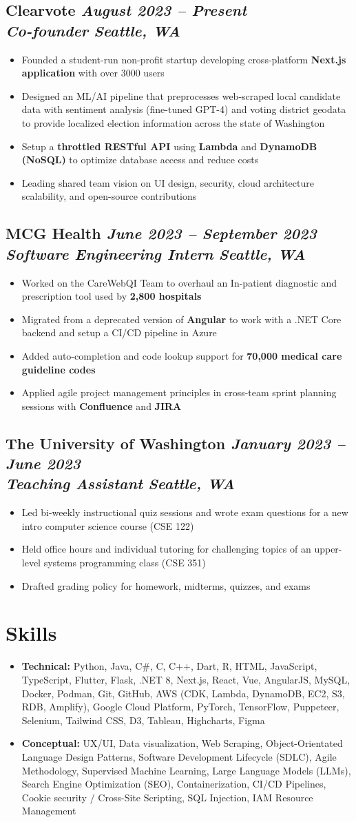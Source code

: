 \documentclass[11pt]{article}
\newcommand{\resumeItem}[1]{
  \item\small{#1}
}
\newcommand{\resumeSubheading}[4]{
  \vspace{-0.5em}
  \subsection{
    \textbf{#1} \hfill \textit{\small#2} \\
    \textit{\small#3} \hfill \textit{\small#4}
  }
  \vspace{-0.5em}
}
\begin{document}
\resumeSubheading{Clearvote}{August 2023 – Present}{Co-founder}{Seattle, WA}
\begin{itemize}[leftmargin=*]
  \resumeItem{Founded a student-run non-profit startup developing cross-platform \textbf{Next.js application} with over 3000 users}
  \resumeItem{Designed an ML/AI pipeline that preprocesses web-scraped local candidate data with sentiment analysis (fine-tuned GPT-4) and voting district geodata to provide localized election information across the state of Washington}
  \resumeItem{Setup a \textbf{throttled RESTful API} using \textbf{Lambda} and \textbf{DynamoDB (NoSQL)} to optimize database access and reduce costs}
  \resumeItem{Leading shared team vision on UI design, security, cloud architecture scalability, and open-source contributions}
\end{itemize}

\resumeSubheading{MCG Health}{June 2023 – September 2023}{Software Engineering Intern}{Seattle, WA}
\begin{itemize}[leftmargin=*]
  \resumeItem{Worked on the CareWebQI Team to overhaul an In-patient diagnostic and prescription tool used by \textbf{2,800 hospitals}}
  \resumeItem{Migrated from a deprecated version of \textbf{Angular} to work with a .NET Core backend and setup a CI/CD pipeline in Azure}
  \resumeItem{Added auto-completion and code lookup support for \textbf{70,000 medical care guideline codes}}
  \resumeItem{Applied agile project management principles in cross-team sprint planning sessions with \textbf{Confluence} and \textbf{JIRA}}
\end{itemize}

\resumeSubheading{The University of Washington}{January 2023 – June 2023}{Teaching Assistant}{Seattle, WA}
\begin{itemize}[leftmargin=*]
  \resumeItem{Led bi-weekly instructional quiz sessions and wrote exam questions for a new intro computer science course (CSE 122)}
  \resumeItem{Held office hours and individual tutoring for challenging topics of an upper-level systems programming class (CSE 351)}
  \resumeItem{Drafted grading policy for homework, midterms, quizzes, and exams}
\end{itemize}

\section{Skills}
\begin{itemize}[leftmargin=*]
  \resumeItem{\textbf{Technical:} Python, Java, C#, C, C++, Dart, R, HTML, JavaScript, TypeScript, Flutter, Flask, .NET 8, Next.js, React, Vue, AngularJS, MySQL, Docker, Podman, Git, GitHub, AWS (CDK, Lambda, DynamoDB, EC2, S3, RDB, Amplify), Google Cloud Platform, PyTorch, TensorFlow, Puppeteer, Selenium, Tailwind CSS, D3, Tableau, Highcharts, Figma}
  \resumeItem{\textbf{Conceptual:} UX/UI, Data visualization, Web Scraping, Object-Orientated Language Design Patterns, Software Development Lifecycle (SDLC), Agile Methodology, Supervised Machine Learning, Large Language Models (LLMs), Search Engine Optimization (SEO), Containerization, CI/CD Pipelines, Cookie security / Cross-Site Scripting, SQL Injection, IAM Resource Management}
\end{itemize}
\end{document}
